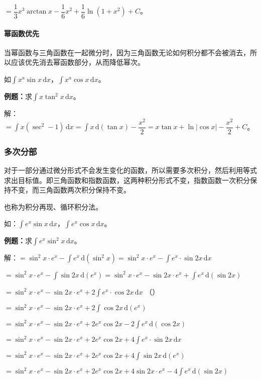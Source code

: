 \documentclass[UTF8, 12pt]{ctexart}
\begin{document}
$=\dfrac{1}{3}x^3\arctan x-\dfrac{1}{6}x^2+\dfrac{1}{6}\ln(1+x^2)+C$。

\paragraph{幂函数优先} \leavevmode \medskip

当幂函数与三角函数在一起微分时，因为三角函数无论如何积分都不会被消去，所以应该优先消去幂函数部分，从而降低幂次。

如$\int x^a\sin x\,\textrm{d}x$，$\int x^a\cos x\,\textrm{d}x$。

\textbf{例题：}求$\int x\tan^2x\,\textrm{d}x$。

解：$=\int x(\sec^2-1)\,\textrm{d}x=\int x\,\textrm{d}(\tan x)-\dfrac{x^2}{2}=x\tan x+\ln\vert\cos x\vert-\dfrac{x^2}{2}+C$。

\subsubsection{多次分部}

对于一部分通过微分形式不会发生变化的函数，所以需要多次积分，然后利用等式求出目标值。即三角函数和指数函数，这两种积分形式不变，指数函数一次积分保持不变，而三角函数两次积分保持不变。

也称为积分再现、循环积分法。

如：$\int e^x\sin x\,\textrm{d}x$，$\int e^x\cos x\,\textrm{d}x$。

\textbf{例题：}求$\int e^x\sin^2x\,\textrm{d}x$。

解：$=\sin^2x\cdot e^x-\int e^x\,\textrm{d}(\sin^2x)=\sin^2x\cdot e^x-\int e^x\cdot\sin 2x\,\textrm{d}x$

$=\sin^2x\cdot e^x-\int\sin2x\,\textrm{d}(e^x)=\sin^2x\cdot e^x-\sin2x\cdot e^x+\int e^x\,\textrm{d}(\sin2x)$

$=\sin^2x\cdot e^x-\sin2x\cdot e^x+2\int e^x\cdot\cos2x\,\textrm{d}x$ （）

$=\sin^2x\cdot e^x-\sin2x\cdot e^x+2\int\cos2x\,\textrm{d}(e^x)$

$=\sin^2x\cdot e^x-\sin2x\cdot e^x+2e^x\cos2x-2\int e^x\,\textrm{d}(\cos2x)$

$=\sin^2x\cdot e^x-\sin2x\cdot e^x+2e^x\cos2x+4\int e^x\cdot\sin2x\,\textrm{d}x$

$=\sin^2x\cdot e^x-\sin2x\cdot e^x+2e^x\cos2x+4\int\sin2x\,\textrm{d}(e^x)$

$=\sin^2x\cdot e^x-\sin2x\cdot e^x+2e^x\cos2x+4\sin2x\cdot e^x-4\int e^x\,\textrm{d}(\sin2x)$
\end{document}
